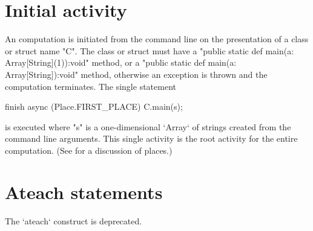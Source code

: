 
\section{Initial activity}\label{initial-computation}

An \Xten{} computation is initiated from the command line on the
presentation of a class or struct name \xcd"C". The class or struct must have a
\xcd"public static def main(a: Array[String](1)):void" method, 
or a \xcd"public static def main(a: Array[String]):void" method, 
otherwise an exception is thrown
and the computation terminates.  The single statement
\begin{xten}
finish async (Place.FIRST_PLACE) {
  C.main(s);
}
\end{xten} 
\noindent is executed where \xcd"s" is a one-dimensional \xcd`Array` of
strings created 
from the command line arguments. This single activity is the root activity
for the entire computation. (See  for a discussion of
places.)


\section{Ateach statements}\label{ateach-section}
\deprecated{} The \xcd`ateach` construct is deprecated.

